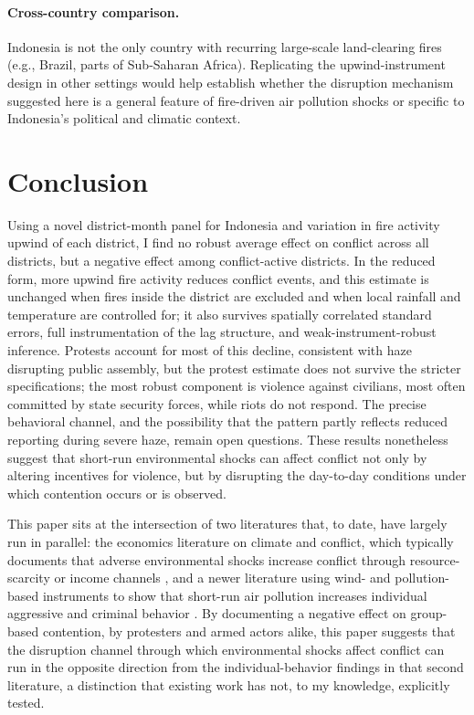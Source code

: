 \documentclass[12pt]{article}
\begin{document}
\paragraph{Cross-country comparison.} Indonesia is not the only country with recurring large-scale land-clearing fires (e.g., Brazil, parts of Sub-Saharan Africa). Replicating the upwind-instrument design in other settings would help establish whether the disruption mechanism suggested here is a general feature of fire-driven air pollution shocks or specific to Indonesia's political and climatic context.

\section{Conclusion}
\label{sec:conclusion}

Using a novel district-month panel for Indonesia and variation in fire activity upwind of each district, I find no robust average effect on conflict across all districts, but a negative effect among conflict-active districts. In the reduced form, more upwind fire activity reduces conflict events, and this estimate is unchanged when fires inside the district are excluded and when local rainfall and temperature are controlled for; it also survives spatially correlated standard errors, full instrumentation of the lag structure, and weak-instrument-robust inference. Protests account for most of this decline, consistent with haze disrupting public assembly, but the protest estimate does not survive the stricter specifications; the most robust component is violence against civilians, most often committed by state security forces, while riots do not respond. The precise behavioral channel, and the possibility that the pattern partly reflects reduced reporting during severe haze, remain open questions. These results nonetheless suggest that short-run environmental shocks can affect conflict not only by altering incentives for violence, but by disrupting the day-to-day conditions under which contention occurs or is observed.

This paper sits at the intersection of two literatures that, to date, have largely run in parallel: the economics literature on climate and conflict, which typically documents that adverse environmental shocks increase conflict through resource-scarcity or income channels \citep{hsiang2013quantifying,burkehsiangmiguel2015}, and a newer literature using wind- and pollution-based instruments to show that short-run air pollution increases individual aggressive and criminal behavior \citep{herrnstadt2021,bondyrothsager2020,burkhardt2019}. By documenting a negative effect on group-based contention, by protesters and armed actors alike, this paper suggests that the disruption channel through which environmental shocks affect conflict can run in the opposite direction from the individual-behavior findings in that second literature, a distinction that existing work has not, to my knowledge, explicitly tested.
\end{document}
